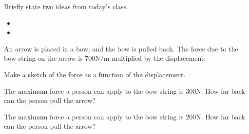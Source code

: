 \postClass

\begin{problem}
\item Briefly state two ideas from today's class.
  \begin{itemize}
  \item 
  \item 
  \end{itemize}
\item 
  \begin{subproblem}
    \item
  \end{subproblem}
\end{problem}



\begin{problem}
\item An arrow is placed in a bow, and the bow is pulled back. The
  force due to the bow string on the arrow is 700N/m multiplied by the
  displacement. 
  \begin{subproblem}
  \item Make a sketch of the force as a function of the displacement.
    \vfill
  \item The maximum force a person can apply to the bow string is
    300N. How far back can the person pull the arrow?
    \vfill
  \item The maximum force a person can apply to the bow string is
    200N. How far back can the person pull the arrow?
    \vfill
  \end{subproblem}
\end{problem}


